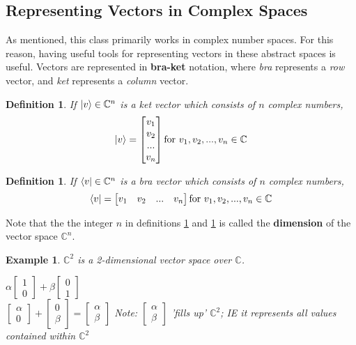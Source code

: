 \documentclass[12pt]{article}
\theoremstyle{plain}
\theoremstyle{nonumberplain}
\theoremstyle{plain}
\newtheorem{definition}[lemma]{Definition}
\newtheorem{example}[lemma]{Example}
\theoremstyle{nonumberplain}
\newcommand\1{{\bf 1}}
\newcommand{\bmat}[1]{\begin{bmatrix*} #1 \end{bmatrix*}} %
\newcommand{\C}{\mathbb{C}} %
\newcommand{\<}{\left\langle}
\renewcommand{\>}{\right\rangle}
\begin{document}
\subsection{Representing Vectors in Complex Spaces}
As mentioned, this class primarily works in complex number spaces. For this reason, having useful tools for representing vectors in these abstract spaces is useful. Vectors are represented in \textbf{bra-ket} notation, where \textit{bra} represents a \textit{row} vector, and \textit{ket} represents a \textit{column} vector.

\begin{definition}\label{def:ket}
If $\ket{v}\in\C^n$ is a \textit{ket} vector which consists of $n$ complex numbers,
\begin{equation}
\ket{v}=\bmat{v_1 \\ v_2 \\ ... \\ v_n} \textrm{for } v_1, v_2, ..., v_n \in \C
\end{equation}
\end{definition}

\begin{definition}\label{def:bra}
If $\bra{v}\in\C^n$ is a \textit{bra} vector which consists of $n$ complex numbers,
\begin{equation}
\bra{v}=\bmat{v_1 & v_2 & ... & v_n} \textrm{for } v_1, v_2, ..., v_n \in \C
\end{equation}
\end{definition}
Note that the the integer $n$ in definitions \ref{def:ket} and \ref{def:bra} is called the \textbf{dimension} of the vector space $\C^n$.

\begin{example}
$\C^2$ is a 2-dimensional vector space over $\C$.
\begin{center}
$\alpha\bmat{1 \\ 0} + \beta\bmat{0 \\ 1}$ \\
$\bmat{\alpha \\ 0}+\bmat{0 \\ \beta}=\bmat{\alpha \\ \beta}$
Note: $\bmat{\alpha \\ \beta}$ 'fills up' $\C^2$; IE it represents all values contained within $\C^2$
\end{center}
\end{example}

\end{document}
